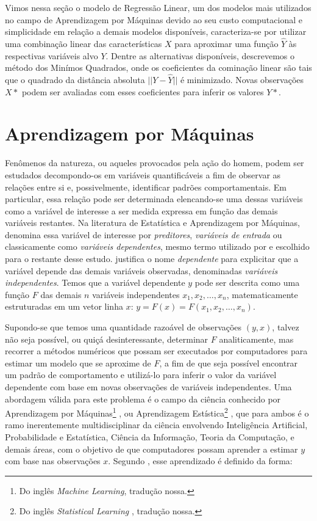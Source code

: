 Vimos nessa seção o modelo de Regressão Linear, um dos modelos mais utilizados no campo de Aprendizagem por Máquinas devido ao seu custo computacional e simplicidade em relação a demais modelos disponíveis, caracteriza-se por utilizar uma combinação linear das características $ X $ para aproximar uma função $ \hat{Y} $ às respectivas variáveis alvo $ Y $. Dentre as alternativas disponíveis, descrevemos o método dos Minímos Quadrados, onde os coeficientes da cominação linear são tais que o quadrado da distância absoluta $ ||Y-\hat{Y}|| $ é minimizado. Novas observações $ X* $ podem ser avaliadas com esses coeficientes para inferir os valores $ Y* $.



\section{Aprendizagem por Máquinas}\label{sec:aprendizagem_maquinas}

Fenômenos da natureza, ou aqueles provocados pela ação do homem, podem ser estudados decompondo-os em variáveis quantificáveis a fim de observar as relações entre si e, possivelmente, identificar padrões comportamentais. Em particular, essa relação pode ser determinada elencando-se uma dessas variáveis como a variável de interesse a ser medida expressa em função das demais variáveis restantes. Na literatura de Estatística e Aprendizagem por Máquinas, \cite{Hastie} denomina essa variável de interesse por \textit{preditores}, \textit{variáveis de entrada} ou classicamente como \textit{variáveis dependentes}, mesmo termo utilizado por \cite{Cohen} e escolhido para o restante desse estudo. \cite{Cohen} justifica o nome \textit{dependente} para explicitar que a variável depende das demais variáveis observadas, denominadas \textit{variáveis independentes}. Temos que a variável dependente $ y $ pode ser descrita como uma função $ F $ das demais $ n $ variáveis independentes $ x_1, x_2, \dots, x_n $, matematicamente estruturadas em um vetor linha $ x $: $ y = F(x) = F(x_1, x_2, \dots, x_n)$. 

Supondo-se que temos uma quantidade razoável de observações $ (y,x)  $, talvez não seja possível, ou quiçá desinteressante, determinar $ F $ analiticamente, mas recorrer a métodos numéricos que possam ser executados por computadores para estimar um modelo que se aproxime de $ F $, a fim de que seja possível encontrar um padrão de comportamento e utilizá-lo para inferir o valor da variável dependente com base em novas observações de variáveis independentes. Uma abordagem válida para este problema é o campo da ciência conhecido por  Aprendizagem por Máquinas\footnote{Do inglês \textit{Machine Learning}, tradução nossa.} \cite[p.2]{Mitchell}, ou Aprendizagem Estística\footnote{Do inglês \textit{Statistical Learning }, tradução nossa.} \cite[p.4]{Hastie}, que para ambos é o ramo inerentemente multidisciplinar da ciência envolvendo Inteligência Artificial, Probabilidade e Estatística, Ciência da Informação, Teoria da Computação, e demais áreas, com o objetivo de que computadores possam aprender a estimar $ y $ com base nas observações $ x $. Segundo \cite{Mitchell}, esse aprendizado é definido da forma:

